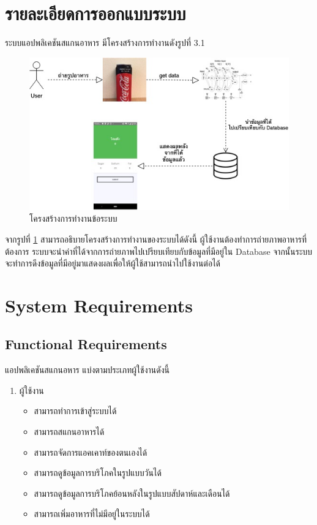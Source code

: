\section{รายละเอียดการออกแบบระบบ}
 ระบบแอปพลิเคชันสแกนอาหาร มีโครงสร้างการทำงานดังรูปที่ 3.1
   	\begin{figure}[H]
   		\centering
   		\includegraphics[width=\textwidth]{Figures/3/architecture/Arc1.jpg}
   		\caption{โครงสร้างการทำงานข้อระบบ}
   		\label{Fig:architecture}
   	\end{figure}
   
	 จากรูปที่ \ref{Fig:architecture} สามารถอธิบายโครงสร้างการทำงานของระบบได้ดังนี้ ผู้ใช้งานต้องทำการถ่ายภาพอาหารที่ต้องการ ระบบจะนำค่าที่ได้จากการถ่ายภาพไปเปรียบเทียบกับข้อมูลที่มีอยู่ใน
	 Database จากนั้นระบบจะทำการดึงข้อมูลที่มีอยู่มาแสดงผลเพื่อให้ผู้ใช้สามารถนำไปใช้งานต่อได้ 
   

\section{System Requirements}
\subsection{Functional Requirements} 
แอปพลิเคชันสแกนอหาร แบ่งตามประเภทผู้ใช้งานดังนี้ 
\begin{enumerate}
		\item ผู้ใช้งาน
			\begin{itemize}[label={--}]
				\item สามารถทำการเข้าสู่ระบบได้
				\item สามารถสแกนอาหารได้
				\item สามารถจัดการแอคเคาท์ของตนเองได้
				\item สามารถดูข้อมูลการบริโภคในรูปแบบวันได้
				\item สามารถดูข้อมูลการบริโภคย้อนหลังในรูปแบบสัปดาห์และเดือนได้ 
				\item สามารถเพิ่มอาหารที่ไม่มีอยู่ในระบบได้
			\end{itemize}
			\end{enumerate}

